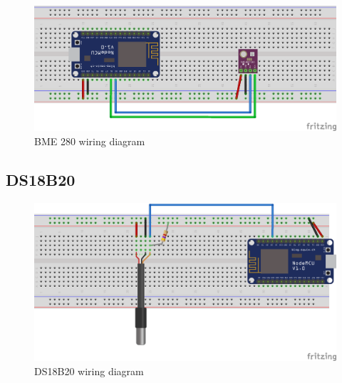 \begin{figure}[H]
	\centering
	\includegraphics[width=\textwidth]{img/bme280_schema.png}
	\caption{BME 280 wiring diagram}
	\label{fig:bme280_schema}
\end{figure}


\subsection{DS18B20}


\begin{figure}[H]
	\centering
	\includegraphics[width=\textwidth]{img/ds18b20_schema.png}
	\caption{DS18B20 wiring diagram}
	\label{fig:ds18b20_schema}
\end{figure}

